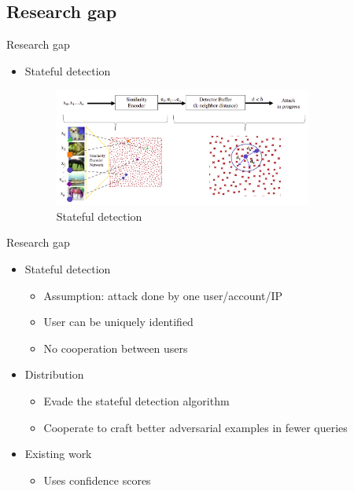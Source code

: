 \documentclass[11pt,t]{beamer}
\begin{document}
\subsection{Research gap}
\begin{frame}{Research gap}
	\begin{itemize}
	\item Stateful detection
	
		\begin{figure}
		\centering
		\includegraphics[width=0.8\textwidth]{graphics/stateful_detection.png}
		\caption{Stateful detection \cite{chen2019stateful}	
		\label{fig:stateful_detection}}
		\footnotesize
		\flushleft
		\end{figure}
	\end{itemize}
\end{frame}

\begin{frame}{Research gap}
\begin{itemize}
	\item Stateful detection
	\begin{itemize}
		\item Assumption: attack done by \alert{one} user/account/IP
		\item User can be uniquely identified
		\item No cooperation between users
	\end{itemize}
	
	\item Distribution
	\begin{itemize}
		\item Evade the stateful detection algorithm
		\item Cooperate to craft better adversarial examples in fewer queries
	\end{itemize}
	
	\item Existing work
	\begin{itemize}
		\item Uses confidence scores \cite{10.1007/978-3-030-59013-0_22, s20247158}
	\end{itemize}
\end{itemize}
\end{frame}
\end{document}
